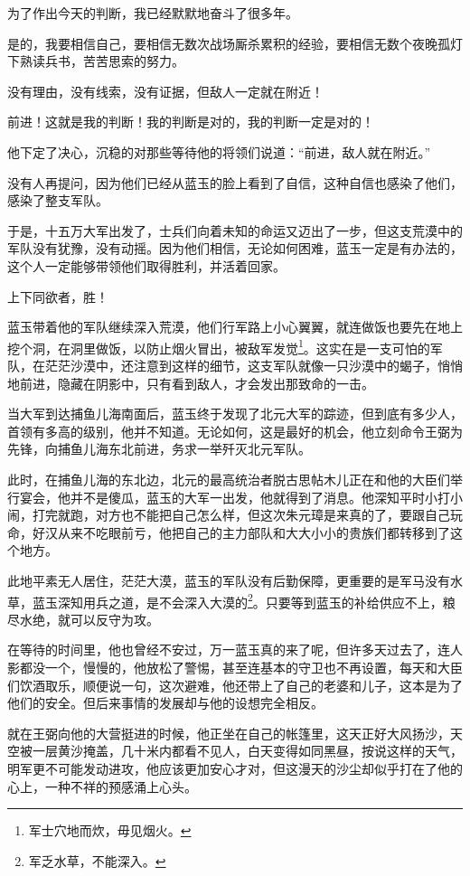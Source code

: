 \begin{multicols}{\theparacolNo}
		为了作出今天的判断，我已经默默地奋斗了很多年。

		是的，我要相信自己，要相信无数次战场厮杀累积的经验，要相信无数个夜晚孤灯下熟读兵书，苦苦思索的努力。

		没有理由，没有线索，没有证据，但敌人一定就在附近！

		前进！这就是我的判断！我的判断是对的，我的判断一定是对的！

		他下定了决心，沉稳的对那些等待他的将领们说道：“前进，敌人就在附近。”

		没有人再提问，因为他们已经从蓝玉的脸上看到了自信，这种自信也感染了他们，感染了整支军队。

		于是，十五万大军出发了，士兵们向着未知的命运又迈出了一步，但这支荒漠中的军队没有犹豫，没有动摇。因为他们相信，无论如何困难，蓝玉一定是有办法的，这个人一定能够带领他们取得胜利，并活着回家。

		上下同欲者，胜！

		蓝玉带着他的军队继续深入荒漠，他们行军路上小心翼翼，就连做饭也要先在地上挖个洞，在洞里做饭，以防止烟火冒出，被敌军发觉\footnote{军士穴地而炊，毋见烟火。}。这实在是一支可怕的军队，在茫茫沙漠中，还注意到这样的细节，这支军队就像一只沙漠中的蝎子，悄悄地前进，隐藏在阴影中，只有看到敌人，才会发出那致命的一击。

		当大军到达捕鱼儿海南面后，蓝玉终于发现了北元大军的踪迹，但到底有多少人，首领有多高的级别，他并不知道。无论如何，这是最好的机会，他立刻命令王弼为先锋，向捕鱼儿海东北前进，务求一举歼灭北元军队。

		此时，在捕鱼儿海的东北边，北元的最高统治者脱古思帖木儿正在和他的大臣们举行宴会，他并不是傻瓜，蓝玉的大军一出发，他就得到了消息。他深知平时小打小闹，打完就跑，对方也不能把自己怎么样，但这次朱元璋是来真的了，要跟自己玩命，好汉从来不吃眼前亏，他把自己的主力部队和大大小小的贵族们都转移到了这个地方。

		此地平素无人居住，茫茫大漠，蓝玉的军队没有后勤保障，更重要的是军马没有水草，蓝玉深知用兵之道，是不会深入大漠的\footnote{军乏水草，不能深入。}。只要等到蓝玉的补给供应不上，粮尽水绝，就可以反守为攻。

		在等待的时间里，他也曾经不安过，万一蓝玉真的来了呢，但许多天过去了，连人影都没一个，慢慢的，他放松了警惕，甚至连基本的守卫也不再设置，每天和大臣们饮酒取乐，顺便说一句，这次避难，他还带上了自己的老婆和儿子，这本是为了他们的安全。但后来事情的发展却与他的设想完全相反。

		就在王弼向他的大营挺进的时候，他正坐在自己的帐篷里，这天正好大风扬沙，天空被一层黄沙掩盖，几十米内都看不见人，白天变得如同黑昼，按说这样的天气，明军更不可能发动进攻，他应该更加安心才对，但这漫天的沙尘却似乎打在了他的心上，一种不祥的预感涌上心头。


\end{multicols}
